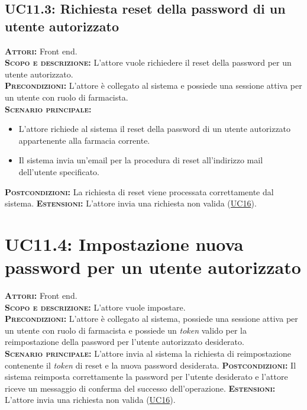 \subsection{UC11.3: Richiesta reset della password di un utente autorizzato}
\label{sec:UC113}
\textsc{\textbf{Attori:}} Front end.\\
\textsc{\textbf{Scopo e descrizione:}} L'attore vuole richiedere il reset della password per un utente autorizzato.\\
\textsc{\textsc{\textbf{Precondizioni:}}} L'attore è collegato al sistema e possiede una sessione attiva per un utente con ruolo di farmacista.\\
\textsc{\textbf{Scenario principale:}} 
\begin{itemize}
    \item L'attore richiede al sistema il reset della password di un utente autorizzato appartenente alla farmacia corrente.
    \item Il sistema invia un'email per la procedura di reset all'indirizzo mail dell'utente specificato.
\end{itemize}
\textsc{\textbf{Postcondizioni:}} La richiesta di reset viene processata correttamente dal sistema.
\textsc{\textbf{Estensioni:}} L'attore invia una richiesta non valida (\hyperref[sec:UC16]{UC16}).

\section{UC11.4: Impostazione nuova password per un utente autorizzato}
\label{sec:UC114}
\textsc{\textbf{Attori:}} Front end.\\
\textsc{\textbf{Scopo e descrizione:}} L'attore vuole impostare.\\
\textsc{\textsc{\textbf{Precondizioni:}}} L'attore è collegato al sistema, possiede una sessione attiva per un utente con ruolo di farmacista e possiede un \textit{token} valido per la reimpostazione della password per l'utente autorizzato desiderato.\\
\textsc{\textbf{Scenario principale:}} L'attore invia al sistema la richiesta di reimpostazione contenente il \textit{token} di reset e la nuova password desiderata.
\textsc{\textbf{Postcondizioni:}} Il sistema reimposta correttamente la password per l'utente desiderato e l'attore riceve un messaggio di conferma del successo dell'operazione.
\textsc{\textbf{Estensioni:}} L'attore invia una richiesta non valida (\hyperref[sec:UC16]{UC16}).

